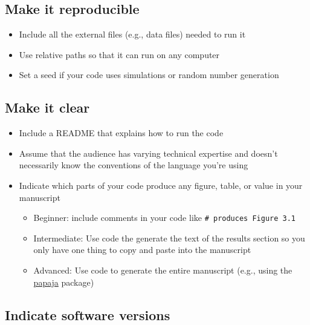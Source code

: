 \documentclass[
  oneside]{book}
\providecommand{\tightlist}{%
  \setlength{\itemsep}{0pt}\setlength{\parskip}{0pt}}
\begin{document}
\hypertarget{make-it-reproducible}{%
\subsection{Make it reproducible}\label{make-it-reproducible}}

\begin{itemize}
\tightlist
\item
  Include all the external files (e.g., data files) needed to run it
\item
  Use relative paths so that it can run on any computer
\item
  Set a seed if your code uses simulations or random number generation
\end{itemize}

\hypertarget{make-it-clear}{%
\subsection{Make it clear}\label{make-it-clear}}

\begin{itemize}
\tightlist
\item
  Include a README that explains how to run the code
\item
  Assume that the audience has varying technical expertise and doesn't necessarily know the conventions of the language you're using
\item
  Indicate which parts of your code produce any figure, table, or value in your manuscript

  \begin{itemize}
  \tightlist
  \item
    {Beginner}: include comments in your code like \texttt{\#\ produces\ Figure\ 3.1}
  \item
    {Intermediate}: Use code the generate the text of the results section so you only have one thing to copy and paste into the manuscript
  \item
    {Advanced}: Use code to generate the entire manuscript (e.g., using the \href{http://frederikaust.com/papaja_man/}{papaja} package)
  \end{itemize}
\end{itemize}

\hypertarget{indicate-software-versions}{%
\subsection{Indicate software versions}\label{indicate-software-versions}}
\end{document}
